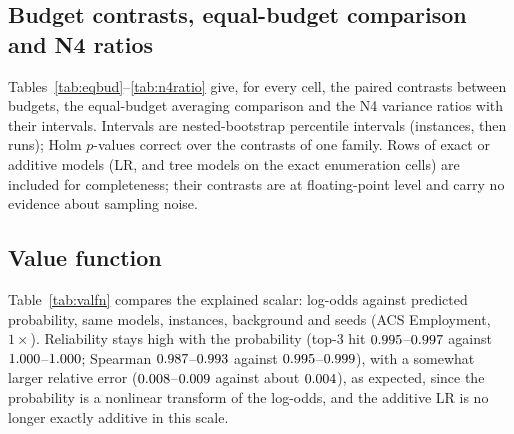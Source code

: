\subsection{Budget contrasts, equal-budget comparison and N4 ratios}
\label{app:contrasts}
Tables~\ref{tab:eqbud}--\ref{tab:n4ratio} give, for every cell, the paired contrasts between budgets, the equal-budget averaging comparison and the N4 variance ratios with their intervals. Intervals are nested-bootstrap percentile intervals (instances, then runs); Holm $p$-values correct over the contrasts of one family. Rows of exact or additive models (LR, and tree models on the exact enumeration cells) are included for completeness; their contrasts are at floating-point level and carry no evidence about sampling noise.


\addtocounter{table}{-1}%
\label{tab:eqbud}


\addtocounter{table}{-1}%
\label{tab:contrasts}


\addtocounter{table}{-1}%
\label{tab:n4ratio}

\subsection{Value function}
\label{app:valfn}
Table~\ref{tab:valfn} compares the explained scalar: log-odds against predicted probability, same models, instances, background and seeds (ACS Employment, $1\times$). Reliability stays high with the probability (top-3 hit $0.995$--$0.997$ against $1.000$--$1.000$; Spearman $0.987$--$0.993$ against $0.995$--$0.999$), with a somewhat larger relative error ($0.008$--$0.009$ against about $0.004$), as expected, since the probability is a nonlinear transform of the log-odds, and the additive LR is no longer exactly additive in this scale.

